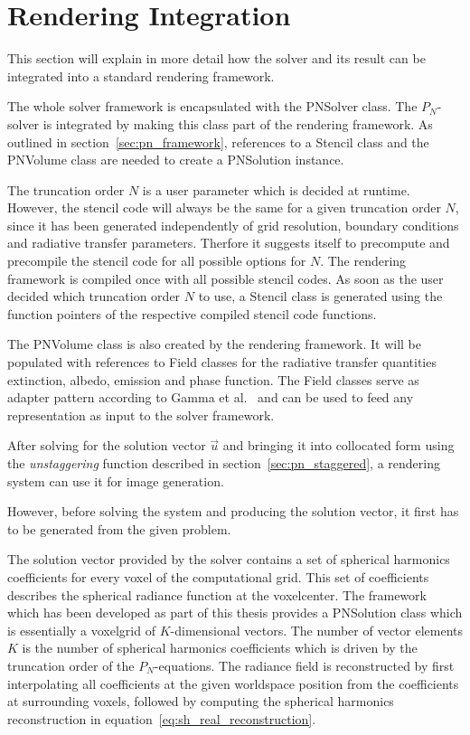 \section{Rendering Integration}
\label{sec:pn_rendering_integration}

This section will explain in more detail how the solver and its result can be integrated into a standard rendering framework.

The whole solver framework is encapsulated with the PNSolver class. The $P_N$-solver is integrated by making this class part of the rendering framework. As outlined in section~\ref{sec:pn_framework}, references to a Stencil class and the PNVolume class are needed to create a PNSolution instance.

The truncation order $N$ is a user parameter which is decided at runtime. However, the stencil code will always be the same for a given truncation order $N$, since it has been generated independently of grid resolution, boundary conditions and radiative transfer parameters. Therfore it suggests itself to precompute and precompile the stencil code for all possible options for $N$. The rendering framework is compiled once with all possible stencil codes. As soon as the user decided which truncation order $N$ to use, a Stencil class is generated using the function pointers of the respective compiled stencil code functions.

The PNVolume class is also created by the rendering framework. It will be populated with references to Field classes for the radiative transfer quantities extinction, albedo, emission and phase function. The Field classes serve as adapter pattern according to Gamma et al.~\cite{Gamma95} and can be used to feed any representation as input to the solver framework.

After solving for the solution vector $\vec{u}$ and bringing it into collocated form using the \emph{unstaggering} function described in section~\ref{sec:pn_staggered}, a rendering system can use it for image generation. 

However, before solving the system and producing the solution vector, it first has to be generated from the given problem.

The solution vector provided by the solver contains a set of spherical harmonics coefficients for every voxel of the computational grid. This set of coefficients describes the spherical radiance function at the voxelcenter. The framework which has been developed as part of this thesis provides a PNSolution class which is essentially a voxelgrid of $K$-dimensional vectors. The number of vector elements $K$ is the number of spherical harmonics coefficients which is driven by the truncation order of the $P_N$-equations. The radiance field is reconstructed by first interpolating all coefficients at the given worldspace position from the coefficients at surrounding voxels, followed by computing the spherical harmonics reconstruction in equation~\ref{eq:sh_real_reconstruction}.

